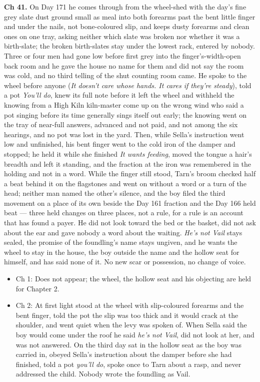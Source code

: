 \documentclass{design/chronicle}
\begin{document}
{\textbf{Ch 41.} On Day 171 he comes through from the wheel-shed with the day’s fine grey slate dust ground small as meal into both forearms past the bent little finger and under the nails, not bone-coloured slip, and keeps dusty forearms and clean ones on one tray, asking neither which slate was broken nor whether it was a birth-slate; the broken birth-slates stay under the lowest rack, entered by nobody. Three or four men had gone low before first grey into the finger’s-width-open back room and he gave the house no name for them and did not say the room was cold, and no third telling of the shut counting room came. He spoke to the wheel before anyone (\emph{It doesn’t care whose hands. It cares if they’re steady}), told a pot \emph{You’ll do}, knew its full note before it left the wheel and withheld the knowing from a High Kiln kiln-master come up on the wrong wind who said a pot singing before its time generally sings itself out early; the knowing went on the tray of near-full answers, advanced and not paid, and not among the six hearings, and no pot was lost in the yard. Then, while Sella’s instruction went low and unfinished, his bent finger went to the cold iron of the damper and stopped; he held it while she finished \emph{It wants feeding}, moved the tongue a hair’s breadth and left it standing, and the fraction at the iron was remembered in the holding and not in a word. While the finger still stood, Tarn’s broom checked half a beat behind it on the flagstones and went on without a word or a turn of the head; neither man named the other’s silence, and the boy filed the third movement on a place of its own beside the Day 161 fraction and the Day 166 held beat — three held changes on three places, not a rule, for a rule is an account that has found a payer. He did not look toward the bed or the basket, did not ask about the ear and gave nobody a word about the waiting. \emph{He’s not Vail} stays sealed, the promise of the foundling’s name stays ungiven, and he wants the wheel to stay in the house, the boy outside the name and the hollow seat for himself, and has said none of it. No new scar or possession, no change of voice.

\begin{itemize}[leftmargin=1.4em,itemsep=1pt,topsep=3pt,parsep=0pt]

\item Ch 1: Does not appear; the wheel, the hollow seat and his objecting are held for Chapter 2.

\item Ch 2: At first light stood at the wheel with slip-coloured forearms and the bent finger, told the pot the slip was too thick and it would crack at the shoulder, and went quiet when the levy was spoken of. When Sella said the boy would come under the roof he said \emph{he’s not Vail}, did not look at her, and was not answered. On the third day sat in the hollow seat as the boy was carried in, obeyed Sella’s instruction about the damper before she had finished, told a pot \emph{you’ll do}, spoke once to Tarn about a rasp, and never addressed the child. Nobody wrote the foundling as Vail.


\end{itemize}}
\end{document}

